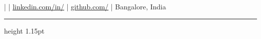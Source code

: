 \begin{center}
{\huge \textbf{\name}} \\[0.12em]
{\color{highlight} \large \role} \\[0.18em]
\small
\phone \quad | \quad
\href{mailto:\email}{\email} \quad | \quad
\href{https://www.linkedin.com/in/\LinkedIn}{linkedin.com/in/\LinkedIn} \quad | \quad
\href{https://github.com/\github}{github.com/\github} \quad | \quad
Bangalore, India
\end{center}
\vspace{0.22em}
{\color{highlight}\hrule height 1.15pt}
\vspace{0.38em}
